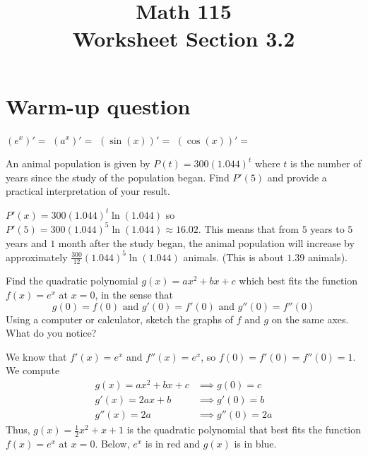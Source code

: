 \documentclass[11pt]{exam}
\title{\vspace{-0.5in} Math 115 \\ Worksheet Section 3.2}
\date{}
\begin{document}
\maketitle
\vspace{-0.75in}
\section*{Warm-up question}

\noindent
$\left( e^x \right)' =$ \fillin[\(e^x\)] $\left( a^x \right)' =$
\fillin[\( a^x\ln(a)\)] $\left( \sin(x) \right)' =$ \fillin[\(\cos(x)\)] $\left( \cos(x) \right)' =$\fillin[\(-\sin(x)\)]

\noindent


\vspace{2em}
\begin{questions}
  \question An animal population is given by \(P(t) = 300(1.044)^t\)
    where \(t\) is the number of years since the study of the
    population began. Find \(P'(5)\) and provide a practical
    interpretation of your result.
    \begin{solution}
      \(P'(x) = 300(1.044)^t \ln(1.044)\) so \(P'(5) = 300(1.044)^5
      \ln(1.044) \approx 16.02\). This means that from \(5\) years to
      \(5\) years and \(1\) month after the study began, the animal
      population will increase by approximately
      \(\frac{300}{12}(1.044)^5\ln(1.044)\) animals. (This is about
      \(1.39\) animals).
    \end{solution}
    \vspace{1em}
  \question Find the quadratic polynomial \(g(x) = ax^2+bx+c\) which
    best fits the function \(f(x) = e^x\) at \(x=0\), in the sense
    that \[
      g(0) = f(0) \text{ and }g'(0) = f'(0)\text{ and }g''(0) = f''(0)
    \]
    Using a computer or calculator, sketch the graphs of \(f\) and
    \(g\) on the same axes. What do you notice?
    \begin{solution}
      We know that \(f'(x) = e^x\) and \(f''(x) = e^x\), so
      \(f(0)=f'(0)=f''(0)=1\). We compute
      \begin{align*}
        g(x) = ax^2+bx+c & \implies g(0)=c\\
        g'(x) = 2ax+b & \implies g'(0) = b\\
        g''(x) = 2a & \implies g''(0) = 2a
      \end{align*}
      Thus, \(g(x) = \frac{1}{2}x^2+x+1\) is the quadratic polynomial
      that best fits the function \(f(x) = e^x\) at \(x=0\). Below,
      \(e^x\) is in red and \(g(x)\) is in blue.

\end{solution}
\end{questions}
\end{document}
